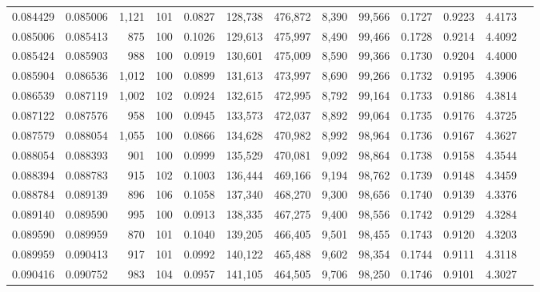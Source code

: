 \begin{tabular}{rrrrrrrrrrrrr}
0.084429 & 0.085006 & 1,121 & 101 &                                     0.0827 & 128,738 & 476,872 &   8,390 &  99,566 & 0.1727 & 0.9223 & 4.4173 \\
0.085006 & 0.085413 &   875 & 100 &                                     0.1026 & 129,613 & 475,997 &   8,490 &  99,466 & 0.1728 & 0.9214 & 4.4092 \\
0.085424 & 0.085903 &   988 & 100 &                                     0.0919 & 130,601 & 475,009 &   8,590 &  99,366 & 0.1730 & 0.9204 & 4.4000 \\
0.085904 & 0.086536 & 1,012 & 100 &                                     0.0899 & 131,613 & 473,997 &   8,690 &  99,266 & 0.1732 & 0.9195 & 4.3906 \\
0.086539 & 0.087119 & 1,002 & 102 &                                     0.0924 & 132,615 & 472,995 &   8,792 &  99,164 & 0.1733 & 0.9186 & 4.3814 \\
0.087122 & 0.087576 &   958 & 100 &                                     0.0945 & 133,573 & 472,037 &   8,892 &  99,064 & 0.1735 & 0.9176 & 4.3725 \\
0.087579 & 0.088054 & 1,055 & 100 &                                     0.0866 & 134,628 & 470,982 &   8,992 &  98,964 & 0.1736 & 0.9167 & 4.3627 \\
0.088054 & 0.088393 &   901 & 100 &                                     0.0999 & 135,529 & 470,081 &   9,092 &  98,864 & 0.1738 & 0.9158 & 4.3544 \\
0.088394 & 0.088783 &   915 & 102 &                                     0.1003 & 136,444 & 469,166 &   9,194 &  98,762 & 0.1739 & 0.9148 & 4.3459 \\
0.088784 & 0.089139 &   896 & 106 &                                     0.1058 & 137,340 & 468,270 &   9,300 &  98,656 & 0.1740 & 0.9139 & 4.3376 \\
0.089140 & 0.089590 &   995 & 100 &                                     0.0913 & 138,335 & 467,275 &   9,400 &  98,556 & 0.1742 & 0.9129 & 4.3284 \\
0.089590 & 0.089959 &   870 & 101 &                                     0.1040 & 139,205 & 466,405 &   9,501 &  98,455 & 0.1743 & 0.9120 & 4.3203 \\
0.089959 & 0.090413 &   917 & 101 &                                     0.0992 & 140,122 & 465,488 &   9,602 &  98,354 & 0.1744 & 0.9111 & 4.3118 \\
0.090416 & 0.090752 &   983 & 104 &                                     0.0957 & 141,105 & 464,505 &   9,706 &  98,250 & 0.1746 & 0.9101 & 4.3027 \\

\end{tabular}
